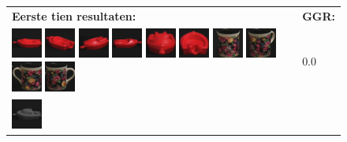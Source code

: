 \begin{figure}[tbp]
\begin{center}
\begin{tabular}{m{11cm} | m{3cm} |}
\textbf{Eerste tien resultaten:} & \textbf{GGR:} \\
\vspace{4pt}
\includegraphics[width=1cm]{coil/beeld-18.eps}
\includegraphics[width=1cm]{coil/beeld-22.eps}
\includegraphics[width=1cm]{coil/beeld-21.eps}
\includegraphics[width=1cm]{coil/beeld-19.eps}
\includegraphics[width=1cm]{coil/beeld-20.eps}
\includegraphics[width=1cm]{coil/beeld-23.eps}
\includegraphics[width=1cm]{coil/beeld-62.eps}
\includegraphics[width=1cm]{coil/beeld-63.eps}
\includegraphics[width=1cm]{coil/beeld-61.eps}
\includegraphics[width=1cm]{coil/beeld-60.eps}
& {\scriptsize 0.0}
\\
\includegraphics[width=1cm]{coil/beeld-24.eps}

\end{tabular}
\end{center}
\end{figure}
